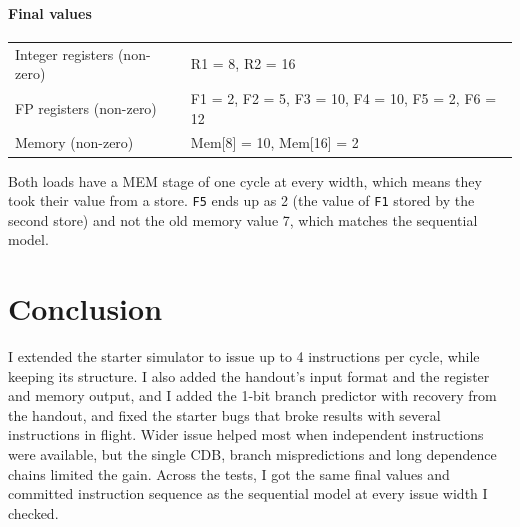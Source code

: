 \documentclass[11pt]{article}
\renewcommand{\_}{\origunderscore\allowbreak}
\begin{document}
\paragraph{Final values}
\begin{tabularx}{\textwidth}{lX}
\hline
Integer registers (non-zero) & R1 = 8, R2 = 16 \\
FP registers (non-zero) & F1 = 2, F2 = 5, F3 = 10, F4 = 10, F5 = 2, F6 = 12 \\
Memory (non-zero) & Mem[8] = 10, Mem[16] = 2 \\
\hline
\end{tabularx}

Both loads have a MEM stage of one cycle at every width, which means they took their value from
a store. \texttt{F5} ends up as 2 (the value of \texttt{F1} stored by the second store) and not
the old memory value 7, which matches the sequential model.

\section{Conclusion}

I extended the starter simulator to issue up to 4 instructions per cycle, while keeping its
structure. I also added the handout's input format and the register and memory output, and I
added the 1-bit branch predictor with recovery from the handout, and fixed the starter bugs that
broke results with several instructions in flight. Wider issue helped most when independent
instructions were available, but the single CDB, branch mispredictions and long dependence chains
limited the gain. Across the tests, I got the same final values and
committed instruction sequence as the sequential model at every issue width I checked.
\end{document}
